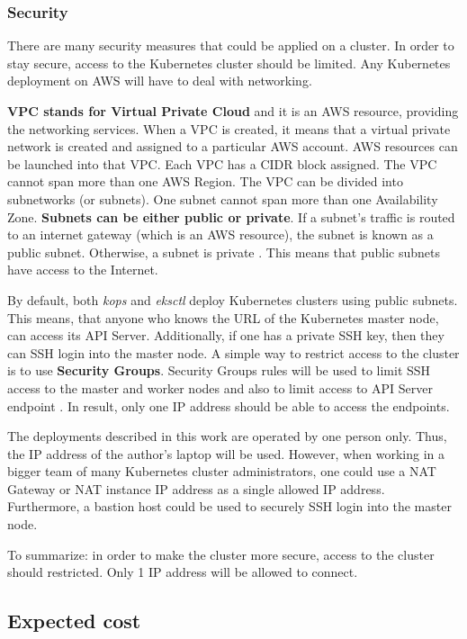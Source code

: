 \subsubsection{Security}

There are many security measures that could be applied on a cluster. In order to stay secure, access to the Kubernetes cluster should be limited. Any Kubernetes deployment on AWS will have to deal with networking.

\textbf{VPC stands for Virtual Private Cloud} and it is an AWS resource, providing the networking services. When a VPC is created, it means that a virtual private network is created and assigned to a particular AWS account. AWS resources can be launched into that VPC. Each VPC has a CIDR block assigned. The VPC cannot span more than one AWS Region. The VPC can be divided into subnetworks (or subnets). One subnet cannot span more than one Availability Zone. \textbf{Subnets can be either public or private}. If a subnet's traffic is routed to an internet gateway (which is an AWS resource), the subnet is known as a public subnet. Otherwise, a subnet is private \cite{aws-vpc}. This means that public subnets have access to the Internet.

By default, both \textit{kops} and \textit{eksctl} deploy Kubernetes clusters using public subnets. This means, that anyone who knows the URL of the Kubernetes master node, can access its API Server. Additionally, if one has a private SSH key, then they can SSH login into the master node. A simple way to restrict access to the cluster is to use \textbf{Security Groups}. Security Groups rules will be used to limit SSH access to the master and worker nodes and also to limit access to API Server endpoint \cite{online-kops-cs}. In result, only one IP address should be able to access the endpoints.

The deployments described in this work are operated by one person only. Thus, the IP address of the author's laptop will be used. However, when working in a bigger team of many Kubernetes cluster administrators, one could use a NAT Gateway or NAT instance IP address as a single allowed IP address. Furthermore, a bastion host could be used to securely SSH login into the master node\cite{aws-bastion}.

To summarize: in order to make the cluster more secure, access to the cluster should restricted. Only 1 IP address will be allowed to connect.

\subsection{Expected cost}


